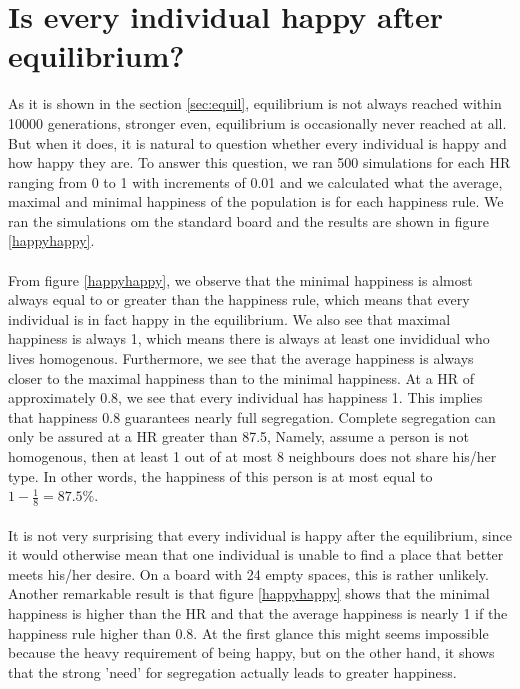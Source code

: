 
\section{Is every individual happy after equilibrium?}
As it is shown in the section \ref{sec:equil}, equilibrium is not always reached within 10000 generations, stronger even, equilibrium is occasionally never reached at all.
But when it does, it is natural to question whether every individual is happy and how happy they are. 
To answer this question, we ran 500 simulations for each HR ranging from 0 to 1 with increments of 0.01 and we calculated what the average, maximal and minimal happiness of the population is for each happiness rule. 
We ran the simulations om the standard board and the results are shown in figure \ref{happyhappy}.\\
\\
From figure \ref{happyhappy}, we observe that the minimal happiness is almost always equal to or greater than the happiness rule, which means that every individual is in fact happy  in the equilibrium. 
We also see that maximal happiness is always 1, which means there is always at least one invididual who lives homogenous. 
Furthermore, we see that the average happiness is always closer to the maximal happiness than to the minimal happiness. At a HR of approximately 0.8, we see that every individual has happiness 1. 
This implies that happiness 0.8 guarantees nearly full segregation. Complete segregation can only be assured at a HR greater than 87.5, Namely, assume a person is not homogenous, then at least 1 out of at most 8 neighbours does not share his/her type. In other words, the happiness of this person is at most equal to \(1-\frac{1}{8}=87.5\%\).\\
\\
It is not very surprising that every individual is happy after the equilibrium, since it would otherwise mean that one individual is unable to find a place that better meets his/her desire. 
On a board with 24 empty spaces, this is rather unlikely. 
Another remarkable result is that figure \ref{happyhappy} shows that the minimal happiness is higher than the HR and that the average happiness is nearly 1 if the happiness rule higher than 0.8. 
At the first glance this might seems impossible because the heavy requirement of being happy, but on the other hand, it shows that the strong 'need' for segregation actually leads to greater happiness.
